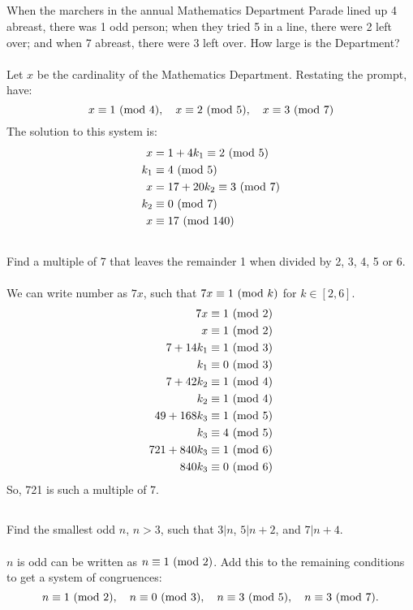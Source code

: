 \documentclass{article}
\begin{document}
\subsection{}
When the marchers in the annual Mathematics Department Parade lined up
4 abreast, there was 1 odd person; when they tried 5 in a line, there were
2 left over; and when 7 abreast, there were 3 left over.
How large is the Department?\\~\\
Let $x$ be the cardinality of the Mathematics Department.
Restating the prompt, have:
\begin{equation*}
    x \equiv 1 \ (\mathrm{mod}\ 4), \quad
    x \equiv 2 \ (\mathrm{mod}\ 5), \quad
    x \equiv 3 \ (\mathrm{mod}\ 7)
\end{equation*}
The solution to this system is:
\begin{align*}
    x &= 1 + 4k_1 \equiv 2 \ (\mathrm{mod}\ 5)\\
    k_1 &\equiv 4 \ (\mathrm{mod}\ 5)\\
    x &= 17 + 20k_2 \equiv 3 \ (\mathrm{mod}\ 7)\\
    k_2 &\equiv 0 \ (\mathrm{mod}\ 7)\\
    x &\equiv 17 \ (\mathrm{mod}\ 140)
\end{align*}

\subsection{}
Find a multiple of 7 that leaves the remainder 1 when divided by 2, 3, 4, 5 or 6.\\~\\
We can write number as $7x$, such that $7x \equiv 1 \ (\mathrm{mod}\ k)$ for $k \in [2, 6]$.
\begin{align*}
    7x \equiv 1 \ (\mathrm{mod}\ 2)\\
    x \equiv 1 \ (\mathrm{mod}\ 2)\\
    7 + 14k_1 \equiv 1 \ (\mathrm{mod}\ 3)\\
    k_1 \equiv 0 \ (\mathrm{mod}\ 3)\\
    7 + 42k_2 \equiv 1 \ (\mathrm{mod}\ 4)\\
    k_2 \equiv 1 \ (\mathrm{mod}\ 4)\\
    49 + 168k_3 \equiv 1 \ (\mathrm{mod}\ 5)\\
    k_3 \equiv 4 \ (\mathrm{mod}\ 5)\\
    721 + 840k_3 \equiv 1 \ (\mathrm{mod}\ 6)\\
    840k_3 \equiv 0 \ (\mathrm{mod}\ 6)\\
\end{align*}
So, 721 is such a multiple of 7.

\subsection{}
Find the smallest odd $n$, $n > 3$, such that $3|n$, $5|n+2$, and $7|n+4$.\\~\\
$n$ is odd can be written as $n \equiv 1 \ (\mathrm{mod}\ 2)$.
Add this to the remaining conditions to get a system of congruences:
\begin{equation*}
    n \equiv 1 \ (\mathrm{mod}\ 2), \quad
    n \equiv 0 \ (\mathrm{mod}\ 3), \quad
    n \equiv 3 \ (\mathrm{mod}\ 5), \quad
    n \equiv 3 \ (\mathrm{mod}\ 7).
\end{equation*}
\end{document}
